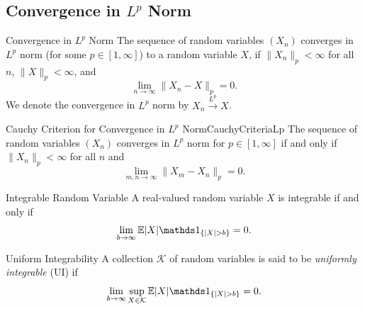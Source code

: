 \subsection{Convergence in $L^p$ Norm}

\begin{defn}{Convergence in $L^p$ Norm}{}
	The sequence of random variables $(X_n)$ converges in $L^p$ norm (for some $p \in [1, \infty]$) to a random variable $X$, if $\|X_n\|_p < \infty$ for all $n$, $\|X\|_p < \infty$, and
	\begin{equation*}
		\lim_{n \to \infty} \|X_n - X\|_p = 0.
	\end{equation*}
	We denote the convergence in $L^p$ norm by $X_n \xrightarrow{L^p} X$.
\end{defn}

\begin{prop}{Cauchy Criterion for Convergence in $L^p$ Norm}{CauchyCriteriaLp}
	The sequence of random variables $(X_n)$ converges in $L^p$ norm for $p \in [1, \infty]$ if and only if $\|X_n\|_p < \infty$ for all $n$ and
	\begin{equation*}
		\lim_{m,n \to \infty} \|X_m - X_n\|_p = 0.
	\end{equation*}
\end{prop}

\begin{prop}{Integrable Random Variable}{}
	A real-valued random variable $X$ is integrable if and only if
	\begin{equation}
		\lim_{b \to \infty} \E |X| \I_{\{|X| > b\}} = 0.
		\label{eq:IntegrableRandomVariableCondition}
	\end{equation}
\end{prop}

\begin{defn}{Uniform Integrability}{}
	A collection $\mathcal{K}$ of random variables is said to be \textit{uniformly integrable} ($\text{UI}$) if
	\begin{equation*}
		\lim_{b \to \infty} \sup_{X \in \mathcal{K}} \E |X| \I_{\{|X| > b\}} = 0.
	\end{equation*}
\end{defn}

